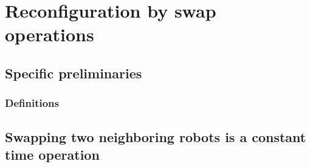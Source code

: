 \section{Reconfiguration by swap operations}

\subsection{Specific preliminaries}

\subsubsection{Definitions}

\subsection{Swapping two neighboring robots is a constant time operation}

\cite{siamcomp/DemaineFKMS19} 
